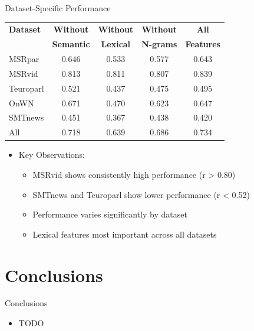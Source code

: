\documentclass{beamer}
\begin{document}
\begin{frame}{Dataset-Specific Performance}
    \begin{center}
        \begin{tabular}{|l|c|c|c|c|}
            \hline
            \textbf{Dataset} & \textbf{Without} & \textbf{Without} & \textbf{Without} & \textbf{All} \\
            & \textbf{Semantic} & \textbf{Lexical} & \textbf{N-grams} & \textbf{Features} \\
            \hline
            MSRpar & 0.646 & 0.533 & 0.577 & 0.643 \\
            MSRvid & 0.813 & 0.811 & 0.807 & 0.839 \\
            Teuroparl & 0.521 & 0.437 & 0.475 & 0.495 \\
            OnWN & 0.671 & 0.470 & 0.623 & 0.647 \\
            SMTnews & 0.451 & 0.367 & 0.438 & 0.420 \\
            \hline
            All & 0.718 & 0.639 & 0.686 & 0.734 \\
            \hline
        \end{tabular}
    \end{center}
    \begin{itemize}
        \item Key Observations:
        \begin{itemize}
            \item MSRvid shows consistently high performance (r \textgreater{} 0.80)
            \item SMTnews and Teuroparl show lower performance (r \textless{} 0.52)
            \item Performance varies significantly by dataset
            \item Lexical features most important across all datasets
        \end{itemize}
    \end{itemize}
\end{frame}

\section{Conclusions}
\begin{frame}{Conclusions}
    \begin{itemize}
        \item TODO
    \end{itemize}
\end{frame}
\end{document}
